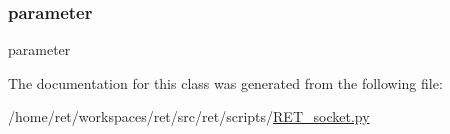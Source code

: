 \subsubsection{\texorpdfstring{parameter}{parameter}}
{\footnotesize\ttfamily parameter}



The documentation for this class was generated from the following file\+:\begin{DoxyCompactItemize}
\item 
/home/ret/workspaces/ret/src/ret/scripts/\hyperlink{RET__socket_8py}{R\+E\+T\+\_\+socket.\+py}\end{DoxyCompactItemize}
